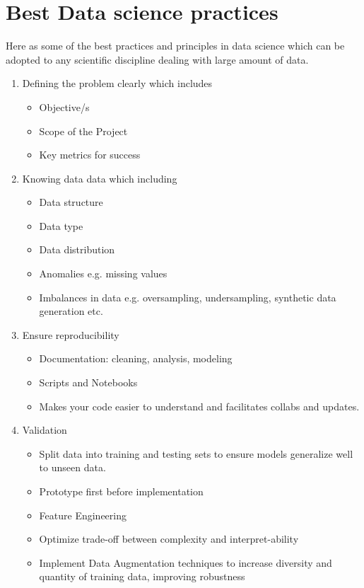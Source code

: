 \documentclass[11pt]{report}
\begin{document}
{\section{Best Data science practices}
	Here as some of the best practices and principles in data science which can be adopted to any scientific discipline dealing with large amount of data.
	\begin{enumerate}
		\item Defining the problem clearly which includes
		\begin{itemize}
			\item Objective/s
			\item Scope of the Project
			\item Key metrics for success
		\end{itemize}
		\item Knowing data data which including
		\begin{itemize}
			\item Data structure
			\item Data type
			\item Data distribution
			\item Anomalies e.g. missing values
			\item Imbalances in data e.g. oversampling, undersampling, synthetic data generation etc. 
		\end{itemize}
		\item Ensure reproducibility
		\begin{itemize}
			\item Documentation: cleaning, analysis, modeling
			\item Scripts and Notebooks 
			\item Makes your code easier to understand and facilitates collabs and updates. 
		\end{itemize}
		\item Validation
		\begin{itemize}
			\item Split data into training and testing sets to ensure models generalize well to unseen data. \item Prototype first before implementation
			\item Feature Engineering
			\item Optimize trade-off between complexity and interpret-ability 
			\item Implement Data Augmentation techniques to increase diversity and quantity of training data, improving robustness
		\end{itemize}

\end{enumerate}}
\end{document}
